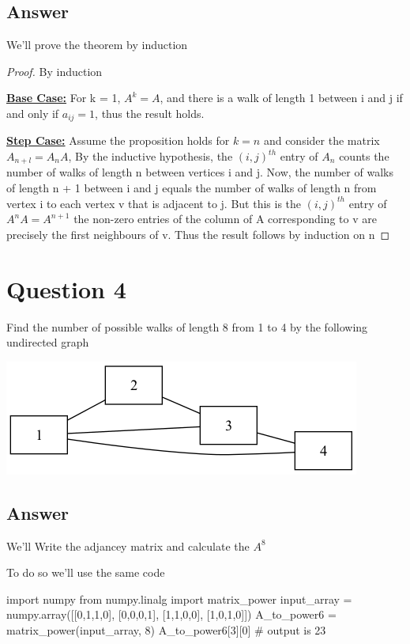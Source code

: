 \documentclass[9pt,twocolumn]{article}
\begin{document}
\subsection*{Answer}
\label{sec:org25e04e8}
We'll prove the theorem by induction
\begin{proof}
By induction

\underline{\textbf{Base Case:}}
For k = 1, \( A^k = A \), and there is a walk of length 1 between i and j
if and only if \(a_{ij} = 1\), thus the result holds.


\underline{\textbf{Step Case:}}
Assume the proposition holds for
\( k = n \) and consider the matrix \( A_{n+l} = A_nA \), By the inductive hypothesis, the
\( (i,j)^{th} \) entry of \( A_n \) counts the number of walks of length n between vertices i
and j. Now, the number of walks of length n + 1 between i and j equals the
number of walks of length n from vertex i to each vertex v that is adjacent to j.
But this is the \( (i,j)^{th} \) entry of \( A^nA = A^{n+1} \) the non-zero entries of the column
of A corresponding to v are precisely the first neighbours of v. Thus the result
follows by induction on n
\end{proof}

\section*{Question 4}
\label{sec:orgf491d3e}
Find the number of possible walks of length 8 from 1 to 4 by the following undirected graph

\begin{center}
\includegraphics[width=.9\linewidth]{Question1_graph.png}
\end{center}
\subsection*{Answer}
\label{sec:org9fc08d1}
We'll Write the adjancey matrix and calculate the \(A^8\)

To do so we'll use the same code

\label{calculate:question4:walks}
\begin{python}
import numpy
from numpy.linalg import matrix_power
input_array = numpy.array([[0,1,1,0],
                           [0,0,0,1],
                           [1,1,0,0],
                           [1,0,1,0]])
A_to_power6 = matrix_power(input_array, 8)
A_to_power6[3][0]
# output is 23
\end{python}
\end{document}
